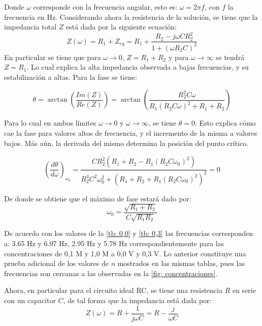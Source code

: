 \documentclass[fleqn,11pt]{SelfArx}
\begin{document}
	Donde $\omega$ corresponde con la frecuencia angular, esto es: $\omega = 2\pi f$, con $f$ la frecuencia en Hz. Considerando ahora la resistencia de la soluci\'on, se tiene que la impedancia total $Z$ est\'a dada por la siguiente ecuaci\'on:
	\begin{equation}
		Z(\omega) = R_1 + Z_{eq} =  R_1 + \dfrac{R_2 - j\omega CR_2^2}{1+(\omega R_2C)^2}
	\end{equation}
	En particular se tiene que para $\omega \rightarrow 0$, $Z = R_1 + R_2$ y para $\omega \rightarrow \infty$ se tendr\'a $Z = R_1$. Lo cual explica la alta impedancia observada a bajas frecuencias, y su estabilizaci\'on a altas. Para la fase se tiene:
	
	\footnotesize
	\begin{equation}
		\theta = \arctan\left(\dfrac{Im(Z)}{Re(Z)}\right) = \arctan\left(\dfrac{R_2^2C\omega}{R_1(R_2C\omega)^2 + R_1 + R_2}\right)
	\end{equation}
	\normalsize
	
	Para lo cual en ambos l\'imites $\omega\rightarrow 0$ y $\omega\rightarrow \infty$, se tiene $\theta = 0$. Esto explica c\'omo cae la fase para valores altos de frecuencia, y el incremento de la misma a valores bajos. M\'as a\'un, la derivada del mismo determina la posici\'on del punto cr\'itico.
	
	\footnotesize
	\begin{equation}
		\left(\dfrac{d\theta}{d\omega}\right)_{\omega_0} =  \dfrac{CR_2^2\left(R_1 + R_2 -R_1(R_2C\omega_0)^2\right)}{R_2^4C^2\omega_0^2 + \left(R_1 + R_2 + R_1(R_2C\omega_0)^2\right)^2} = 0
	\end{equation}
	\normalsize
	
	De donde se obtiene que el m\'aximo de fase estar\'a dado por:
	\begin{equation}
		\omega_0 = \dfrac{\sqrt{R_1 + R_2}}{C\sqrt{R_1R_2}}
	\end{equation}
	
	De acuerdo con los valores de la \autoref{tb: 0,0} y \autoref{tb: 0,3} las frecuencias corresponden a: 3.65 Hz y 6.97 Hz, 2.95 Hz y 5.78 Hz correspondientemente para las concentraciones de 0,1 M y 1,0 M a 0,0 V y 0,3 V. Lo anterior constituye una prueba adicional de los valores de $n$ mostrados en las mismas tablas, pues las frecuencias son cercanas a las observadas en la \autoref{fig: concentraciones}.
	
	Ahora, en particular para el circuito ideal RC, se tiene una resistencia $R$ en serie con un capacitor $C$, de tal forma que la impedancia est\'a dada por:
	\begin{equation}
		Z(\omega) = R + \dfrac{1}{j\omega C} = R - \dfrac{j}{\omega C}
	\end{equation}
	
\end{document}
